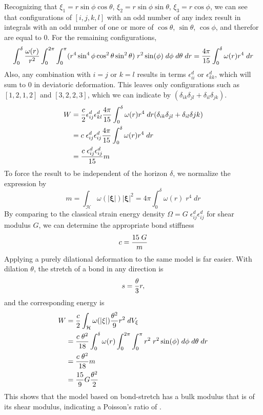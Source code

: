 %
Recognizing that $\xi_1 = r \sin\phi\cos\theta$, $\xi_2=r\sin\phi\sin\theta$, $\xi_3=r\cos\phi$, we can see that configurations of $[i,j,k,l]$ with an odd number of any index result in integrals with an odd number of one or more of $\cos\theta$, $\sin\theta$, $\cos\phi$, and therefor are equal to 0. 
For the remaining configurations,
%
\begin{equation}
\int_0^\delta \frac{\omega(r)}{r^2}\int_0^{2\pi}\int_0^\pi (r^4 \sin^4 \phi \cos^2\theta\sin^2\theta)\;r^2 \sin(\phi)\;d\phi\;d\theta\;dr =  \frac{4\pi}{15} \int_0^\delta \omega(r)r^4\;dr\notag
\end{equation}
%
Also, any combination with $i=j$ or $k=l$ results in terms $\epsilon_{ii}^d$ or  $\epsilon_{kk}^d$, which will sum to 0 in deviatoric deformation. 
This leaves only configurations such as $[1,2,1,2]$ and $[3,2,2,3]$, which we can indicate by $(\delta_{ik}\delta_{jl}+\delta_{il}\delta_{jk})$.
%
\begin{align}
W&= \frac{c}{2}\epsilon_{ij}^d \epsilon_{kl}^d \frac{4\pi}{15} \int_0^\delta \omega(r)r^4\;dr (\delta_{ik}\delta_{jl}+\delta_{il}\delta{jk})\notag\\
&= c \;\epsilon_{ij}^d\epsilon_{ij}^d \frac{4\pi}{15} \int_0^\delta \omega(r)r^4\;dr \notag\\
&= \frac{c\; \epsilon_{ij}^d\epsilon_{ij}^d }{15}m\notag
\end{align}
%
To force the result to be independent of the horizon $\delta$, we normalize the expression by
%
\begin{equation}
\label{eq:weighted}
m=\int_\mathcal{H}\omega(|\boldsymbol{\xi}|)|\boldsymbol{\xi}|^2 = 4\pi \int_0^\delta \omega(r)\;r^4\;dr
\end{equation}
%
By comparing to the classical strain energy density $\Omega = G\;\epsilon_{ij}^d\epsilon_{ij}^d$ for shear modulus $G$, we can determine the appropriate bond stiffness
%
\begin{equation}
c = \frac{15\;G}{m}\notag
\end{equation}
%
Applying a purely dilational deformation to the same model is far easier.
With dilation $\theta$, the stretch of a bond in any direction is
%
\begin{equation}
s = \frac{\theta}{3} r,\notag
\end{equation}
%
and the corresponding energy is 
%
\begin{align}
W &= \frac{c}{2}\int_\mathcal{H} \omega(|\xi|)\frac{\theta^2}{9} r^2 \;dV_\xi\notag\\
&=\frac{c\;\theta^2}{18} \int_0^\delta \omega(r)\int_0^{2\pi}\int_0^\pi r^2\;r^2 \sin(\phi)\;d\phi\;d\theta\;dr \notag\\
&= \frac{c\;\theta^2}{18} m \notag\\
&= \frac{15}{9}G\frac{\theta^2}{2}
\end{align}
%
This shows that the model based on bond-stretch has a bulk modulus that is  of its shear modulus, indicating a Poisson's ratio of .

